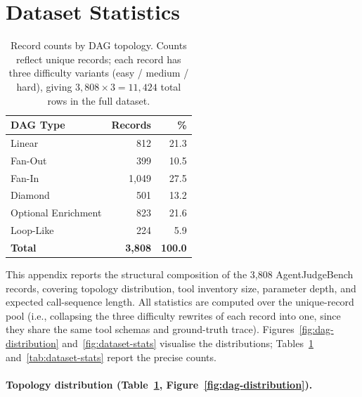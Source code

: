 \section{Dataset Statistics}
\label{app:dataset-stats}

\begin{table}
\centering
\small
\vspace{-12pt}
\setlength{\tabcolsep}{8pt}
\renewcommand{\arraystretch}{1.2}
\caption{Record counts by DAG topology. Counts reflect unique records; each record has three difficulty variants (easy / medium / hard), giving $3{,}808 \times 3 = 11{,}424$ total rows in the full dataset.}
\label{tab:dag-counts}
\begin{tabularx}{0.4\textwidth}{@{}Xrr@{}}
\toprule
\textbf{DAG Type} & \textbf{Records} & \textbf{\%} \\
\midrule
Linear              & \phantom{0}812  & 21.3 \\
Fan-Out             & \phantom{0}399  & 10.5 \\
Fan-In              & 1{,}049          & 27.5 \\
Diamond             & \phantom{0}501  & 13.2 \\
Optional Enrichment & \phantom{0}823  & 21.6 \\
Loop-Like           & \phantom{0}224  &  5.9 \\
\midrule
\textbf{Total}      & \textbf{3{,}808} & \textbf{100.0} \\
\bottomrule
\end{tabularx}
\vspace{-23pt}
\end{table}

This appendix reports the structural composition of the 3,808 AgentJudgeBench records, covering topology distribution, tool inventory size, parameter depth, and expected call-sequence length. All statistics are computed over the unique-record pool (i.e., collapsing the three difficulty rewrites of each record into one, since they share the same tool schemas and ground-truth trace). Figures~\ref{fig:dag-distribution} and~\ref{fig:dataset-stats} visualise the distributions; Tables~\ref{tab:dag-counts} and~\ref{tab:dataset-stats} report the precise counts.

\paragraph{Topology distribution (Table~\ref{tab:dag-counts}, Figure~\ref{fig:dag-distribution}).}

